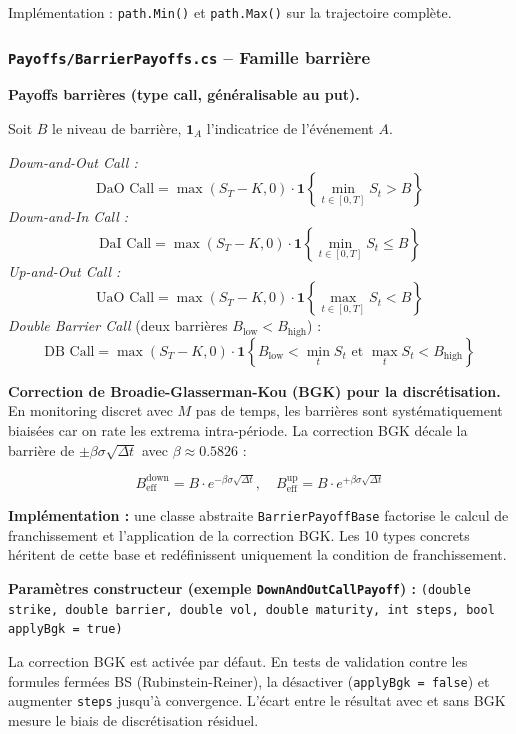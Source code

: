 \documentclass[a4paper,11pt]{article}
\newcommand{\cs}[1]{\texttt{\color{codeinline}#1}}
\begin{document}
Impl\'ementation : \cs{path.Min()} et \cs{path.Max()} sur la trajectoire compl\`ete.

\subsubsection{\texttt{Payoffs/BarrierPayoffs.cs} -- Famille barri\`ere}

\begin{tcolorbox}[math]
\textbf{Payoffs barri\`eres (type call, g\'en\'eralisable au put).}

Soit $B$ le niveau de barri\`ere, $\mathbf{1}_A$ l'indicatrice de l'\'ev\'enement $A$.

\vspace{0.3em}
\textit{Down-and-Out Call :}
\[
  \text{DaO Call} = \max(S_T - K, 0)\cdot\mathbf{1}\!\left\{\min_{t \in [0,T]} S_t > B\right\}
\]
\textit{Down-and-In Call :}
\[
  \text{DaI Call} = \max(S_T - K, 0)\cdot\mathbf{1}\!\left\{\min_{t \in [0,T]} S_t \le B\right\}
\]
\textit{Up-and-Out Call :}
\[
  \text{UaO Call} = \max(S_T - K, 0)\cdot\mathbf{1}\!\left\{\max_{t \in [0,T]} S_t < B\right\}
\]
\textit{Double Barrier Call} (deux barri\`eres $B_{\text{low}} < B_{\text{high}}$) :
\[
  \text{DB Call} = \max(S_T - K, 0)\cdot\mathbf{1}\!\left\{B_{\text{low}} < \min_t S_t \text{ et } \max_t S_t < B_{\text{high}}\right\}
\]
\end{tcolorbox}

\textbf{Correction de Broadie-Glasserman-Kou (BGK) pour la discr\'etisation.}
En monitoring discret avec $M$ pas de temps, les barri\`eres sont syst\'ematiquement
biais\'ees car on rate les extrema intra-p\'eriode. La correction BGK d\'ecale la barri\`ere
de $\pm\beta\sigma\sqrt{\Delta t}$ avec $\beta \approx 0.5826$ :

\[
  B_{\text{eff}}^{\text{down}} = B \cdot e^{-\beta\sigma\sqrt{\Delta t}},\quad
  B_{\text{eff}}^{\text{up}} = B \cdot e^{+\beta\sigma\sqrt{\Delta t}}
\]

\textbf{Impl\'ementation :} une classe abstraite \cs{BarrierPayoffBase} factorise le
calcul de franchissement et l'application de la correction BGK. Les 10 types concrets
h\'eritent de cette base et red\'efinissent uniquement la condition de franchissement.

\textbf{Param\`etres constructeur (exemple \cs{DownAndOutCallPayoff}) :}
\cs{(double strike, double barrier, double vol, double maturity, int steps, bool applyBgk = true)}

\begin{tcolorbox}[note]
La correction BGK est activ\'ee par d\'efaut. En tests de validation contre les formules
ferm\'ees BS (Rubinstein-Reiner), la d\'esactiver (\cs{applyBgk = false}) et augmenter
\cs{steps} jusqu'\`a convergence. L'\'ecart entre le r\'esultat avec et sans BGK mesure
le biais de discr\'etisation r\'esiduel.
\end{tcolorbox}
\end{document}
